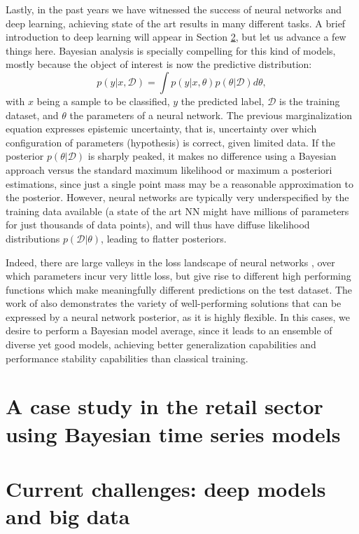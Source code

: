 Lastly, in the past years we have witnessed the success of neural networks and deep learning, achieving state of the art results in many different tasks. A brief introduction to deep learning will appear in Section \ref{sec:deep_intro}, but let us advance a few things here. Bayesian analysis is specially compelling for this kind of models, mostly because the object of interest  is now the predictive distribution:
$$
p(y|x, \mathcal{D}) = \int p(y|x,\theta) p (\theta| \mathcal{D}) d\theta,
$$
with $x$ being a sample to be classified, $y$ the predicted label, $\mathcal{D}$ is the training dataset, and $\theta$ the parameters of a neural network. The previous marginalization equation expresses epistemic uncertainty, that is, uncertainty over which configuration of parameters (hypothesis) is correct, given limited data. If the posterior $p(\theta| \mathcal{D})$ is sharply peaked, it makes no difference using a Bayesian approach versus the standard maximum likelihood or maximum a posteriori estimations, since just a single point mass may be a reasonable approximation to the posterior. However, neural networks are typically very underspecified by the training data available (a state of the art NN might have millions of parameters for just thousands of data points), and will thus have diffuse likelihood distributions $p(\mathcal{D}|\theta)$, leading to flatter posteriors.

Indeed, there are large valleys in the loss landscape of
neural networks \parencite{garipov2018loss}, over which parameters incur very little loss, but give rise to different high performing
functions which make meaningfully different predictions on the test dataset. The work of \parencite{ZOLNA2020102969}
also demonstrates the variety of well-performing solutions that can be expressed by a neural network
posterior, as it is highly flexible. In this cases, we desire to perform a Bayesian model average, since it leads to an ensemble of diverse yet good models, achieving better generalization capabilities and performance stability capabilities than classical training.


\section{A case study in the retail sector using Bayesian time series models}\label{sec:dlms}


\section{Current challenges: deep models and big data}\label{sec:deep_intro}



